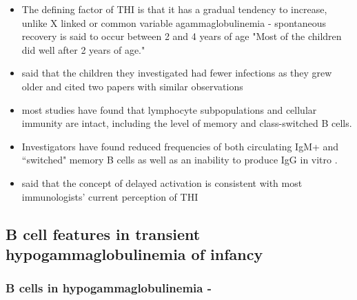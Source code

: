 \documentclass[12pt]{article}
\begin{document}
\begin{itemize}
\begin{enumerate}
		\end{enumerate}
		\item The defining factor of THI is that it has a gradual tendency to increase, unlike X linked or common variable agammaglobulinemia - spontaneous recovery is said to occur between 2 and 4 years of age \citep{Tiller78} "Most of the children did well after 2 years of age." \citep{McGeady87}
		\item \citet{McGeady87} said that the children they investigated had fewer infections as they grew older and cited two papers with similar observations
		\item most studies have found that lymphocyte subpopulations and cellular immunity are intact, including the level of memory and class-switched B cells. 
		\item Investigators have found reduced frequencies of both circulating IgM+ and ``switched" memory B cells as well as an inability to produce IgG in vitro \citep{Ovadia14}.
		\item \citet{McGeady87} said that the concept of delayed activation is consistent with most immunologists' current perception of THI
	\end{itemize} 
	
	\subsection{B cell features in transient hypogammaglobulinemia of infancy}
	
	\subsubsection{B cells in hypogammaglobulinemia - \citeauthor{Fiorilli86} \citeyear{Fiorilli86}}
	
	
	
\end{document}

